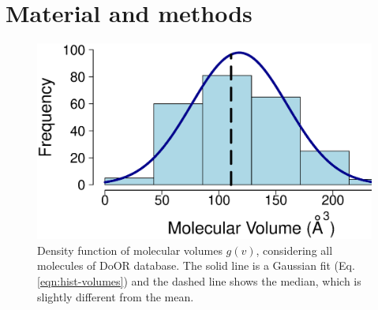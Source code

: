 \documentclass[11pt]{paper} %
\begin{document}






 

 
 

\section*{Material and methods}
\begin{figure}
	\centering
	\includegraphics[width=0.5 \textwidth]{hist-volumes}
	\caption{Density function of molecular volumes $g(v)$, considering all molecules of DoOR database. 
		The solid line is a Gaussian fit (Eq. \ref{eqn:hist-volumes}) and the dashed line shows the median, 
		which is slightly different from  the mean.}
	\label{fig:hist-volumes}
\end{figure}
\end{document}
